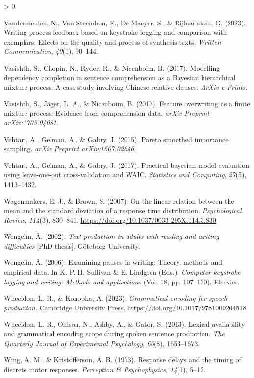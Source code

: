 \documentclass[
  english,
  man,floatsintext]{apa7}
\newlength{\cslhangindent}
\newenvironment{CSLReferences}[2] %
 {%
  \setlength{\parindent}{0pt}
  \ifodd #1 \everypar{\setlength{\hangindent}{\cslhangindent}}\ignorespaces\fi
  \ifnum #2 > 0
  \setlength{\parskip}{#2\baselineskip}
  \fi
 }%
 {}
\begin{document}
\begin{CSLReferences}{1}{0}
\leavevmode\hypertarget{ref-vandermeulen2023writing}{}%
Vandermeulen, N., Van Steendam, E., De Maeyer, S., \& Rijlaarsdam, G. (2023). Writing process feedback based on keystroke logging and comparison with exemplars: Effects on the quality and process of synthesis texts. \emph{Written Communication}, \emph{40}(1), 90--144.

\leavevmode\hypertarget{ref-vasishth2017}{}%
Vasishth, S., Chopin, N., Ryder, R., \& Nicenboim, B. (2017). Modelling dependency completion in sentence comprehension as a {B}ayesian hierarchical mixture process: {A} case study involving {C}hinese relative clauses. \emph{ArXiv e-Prints}.

\leavevmode\hypertarget{ref-vasishth2017feature}{}%
Vasishth, S., Jäger, L. A., \& Nicenboim, B. (2017). Feature overwriting as a finite mixture process: Evidence from comprehension data. \emph{arXiv Preprint arXiv:1703.04081}.

\leavevmode\hypertarget{ref-vehtari2015pareto}{}%
Vehtari, A., Gelman, A., \& Gabry, J. (2015). Pareto smoothed importance sampling. \emph{arXiv Preprint arXiv:1507.02646}.

\leavevmode\hypertarget{ref-vehtari2017practical}{}%
Vehtari, A., Gelman, A., \& Gabry, J. (2017). Practical bayesian model evaluation using leave-one-out cross-validation and {WAIC}. \emph{Statistics and Computing}, \emph{27}(5), 1413--1432.

\leavevmode\hypertarget{ref-wagenmakers2007linear}{}%
Wagenmakers, E.-J., \& Brown, S. (2007). On the linear relation between the mean and the standard deviation of a response time distribution. \emph{Psychological Review}, \emph{114}(3), 830--841. \url{https://doi.org/10.1037/0033-295X.114.3.830}

\leavevmode\hypertarget{ref-wen02}{}%
Wengelin, Å. (2002). \emph{Text production in adults with reading and writing difficulties} {[}PhD thesis{]}. Göteborg University.

\leavevmode\hypertarget{ref-wen06}{}%
Wengelin, Å. (2006). Examining pauses in writing: {T}heory, methods and empirical data. In K. P. H. Sullivan \& E. Lindgren (Eds.), \emph{Computer keystroke logging and writing: Methods and applications} (Vol. 18, pp. 107--130). Elsevier.

\leavevmode\hypertarget{ref-wheeldon_konopka_2023}{}%
Wheeldon, L. R., \& Konopka, A. (2023). \emph{Grammatical encoding for speech production}. Cambridge University Press. \url{https://doi.org/10.1017/9781009264518}

\leavevmode\hypertarget{ref-wheeldon2013}{}%
Wheeldon, L. R., Ohlson, N., Ashby, A., \& Gator, S. (2013). Lexical availability and grammatical encoding scope during spoken sentence production. \emph{The Quarterly Journal of Experimental Psychology}, \emph{66}(8), 1653--1673.

\leavevmode\hypertarget{ref-wing1973response}{}%
Wing, A. M., \& Kristofferson, A. B. (1973). Response delays and the timing of discrete motor responses. \emph{Perception \& Psychophysics}, \emph{14}(1), 5--12.

\end{CSLReferences}
\end{document}

